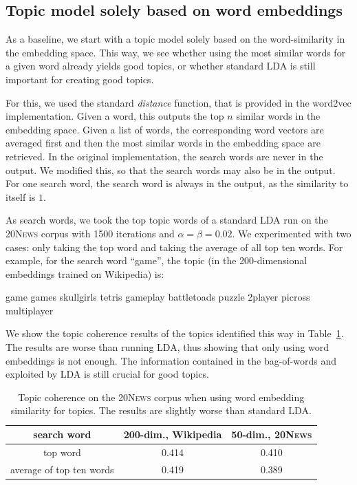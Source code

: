 \documentclass[
        a4paper,
        titlepage,
        twoside,
        parskip,
        numbers=noenddot
        ]{scrbook}
\newcommand{\ra}[1]{\renewcommand{\arraystretch}{#1}}
\newcommand{\topicbox}[1]{
  \setlength{\OuterFrameSep}{0pt}
  \begin{framed}
    #1
  \end{framed}
}
\theoremstyle{break}
\begin{document}
\subsection{Topic model solely based on word embeddings}
\label{sec:raw_tm_we}
As a baseline, we start with a topic model solely based on the word-similarity in the embedding space.
This way, we see whether using the most similar words for a given word already yields good topics, or whether standard LDA is still important for creating good topics.

For this, we used the standard \emph{distance} function, that is provided in the word2vec implementation.
Given a word, this outputs the top $n$ similar words in the embedding space.
Given a list of words, the corresponding word vectors are averaged first and then the most similar words in the embedding space are retrieved.
In the original implementation, the search words are never in the output.
We modified this, so that the search words may also be in the output.
For one search word, the search word is always in the output, as the similarity to itself is $1$.

As search words, we took the top topic words of a standard LDA run on the \textsc{20News} corpus with 1500 iterations and $\alpha = \beta = 0.02$.
We experimented with two cases: only taking the top word and taking the average of all top ten words.
For example, for the search word ``game'', the topic (in the 200-dimensional embeddings trained on Wikipedia) is:
\topicbox{\noindent game games skullgirls tetris gameplay battletoads puzzle 2player picross multiplayer}

We show the topic coherence results of the topics identified this way in Table~\ref{table:raw_we_tm}.
The results are worse than running LDA, thus showing that only using word embeddings is not enough.
The information contained in the bag-of-words and exploited by LDA is still crucial for good topics.
\begin{table}[]
  \ra{1.3}
  \centering
  \caption{Topic coherence on the \textsc{20News} corpus when using word embedding similarity for topics. The results are slightly worse than standard LDA.}
  \label{table:raw_we_tm}
  \begin{tabular}{ccc}
    \toprule
    search word     & 200-dim., Wikipedia & 50-dim., \textsc{20News} \\
    \midrule
    top word                 & 0.414                        & 0.410                    \\
    average of top ten words & 0.419                        & 0.389 \\
    \bottomrule
  \end{tabular}
\end{table}
\end{document}
